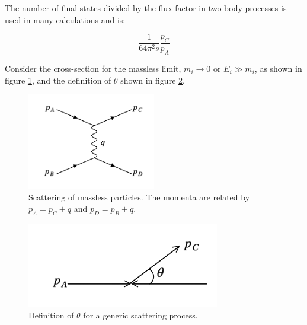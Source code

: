 The number of final states divided by the flux factor in two body processes is used in many calculations and is:

\[
  \frac{1}{64\pi^2s}\frac{p_C}{p_A}
\]

Consider the cross-section for the massless limit, $m_i \to 0$ or $E_i \gg m_i$, as shown in figure \ref{fig:ch7_particleScattering}, and the definition of $\theta$ shown in figure \ref{fig:ch7_genericScatterAngle}.

\begin{figure}[!htb]
  \begin{center}
    \includegraphics[width=0.5\textwidth]{images/web_feynman/image_22.png}
    \caption[Scattering of massless particles]{Scattering of massless particles.  The momenta are related by $p_A=p_C+q$ and $p_D=p_B+q$.}
    \label{fig:ch7_particleScattering}
  \end{center}
\end{figure}

\begin{figure}[!htb]
  \begin{center}
    \includegraphics[width=0.75\textwidth]{images/web_feynman/image_23.png}
    \caption[Definition of $\theta$ for a scattering of massless particles]{Definition of $\theta$ for a generic scattering process.}
    \label{fig:ch7_genericScatterAngle}
  \end{center}
\end{figure}

